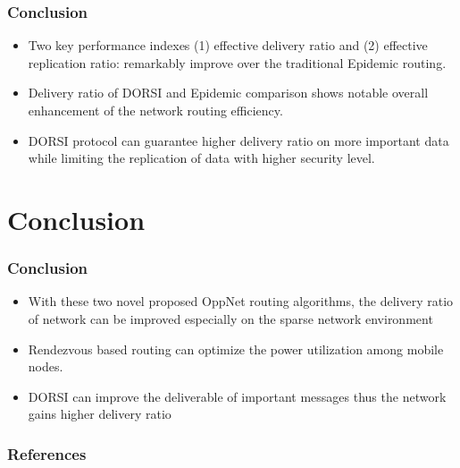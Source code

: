 \documentclass{beamer}
\begin{document}
\begin{frame}
	\frametitle{Conclusion}
	\begin{itemize}
		\item Two key performance indexes (1) effective delivery ratio and (2) effective replication ratio: remarkably improve over the traditional Epidemic routing. 
		\item Delivery ratio of DORSI and Epidemic comparison shows notable overall enhancement of the network routing efficiency. \item DORSI protocol can guarantee higher delivery ratio on more important data while limiting the replication of data with higher security level. 
		
	\end{itemize}
	
\end{frame}
\section{Conclusion }
\begin{frame}
	\frametitle{Conclusion }
	\begin{itemize}
		\item With these two novel proposed OppNet routing algorithms, the delivery ratio of network can be improved especially on the sparse network environment
		\item Rendezvous based routing can optimize the power utilization among mobile nodes.
		\item DORSI can improve the deliverable of important messages thus the network gains higher delivery ratio
	\end{itemize}
	
\end{frame}


\begin{frame}
\frametitle{References}
\footnotesize{



}
\end{frame}
\end{document}
